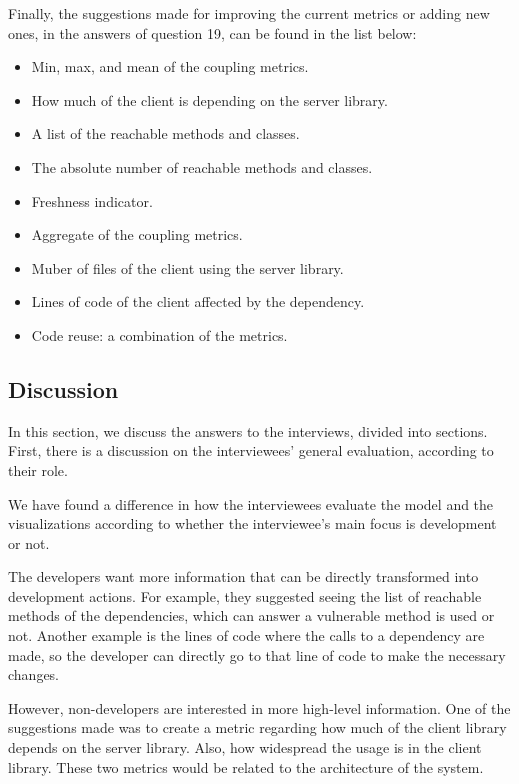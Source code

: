 Finally, the suggestions made for improving the current metrics or adding new ones, in the answers of question 19, can be found in the list below:

\begin{itemize}
  \item Min, max, and mean of the coupling metrics.
  \item How much of the client is depending on the server library.
  \item A list of the reachable methods and classes.
  \item The absolute number of reachable methods and classes.
  \item Freshness indicator.
  \item Aggregate of the coupling metrics.
  \item Muber of files of the client using the server library.
  \item Lines of code of the client affected by the dependency.
  \item Code reuse: a combination of the metrics.
\end{itemize}

\subsection{Discussion}\label{sec:discussion-interviews}
In this section, we discuss the answers to the interviews, divided into sections. First, there is a discussion on the interviewees' general evaluation, according to their role.

We have found a difference in how the interviewees evaluate the model and the visualizations according to whether the interviewee's main focus is development or not.

The developers want more information that can be directly transformed into development actions. For example, they suggested seeing the list of reachable methods of the dependencies, which can answer a vulnerable method is used or not. Another example is the lines of code where the calls to a dependency are made, so the developer can directly go to that line of code to make the necessary changes.

However, non-developers are interested in more high-level information. One of the suggestions made was to create a metric regarding how much of the client library depends on the server library. Also, how widespread the usage is in the client library. These two metrics would be related to the architecture of the system.

